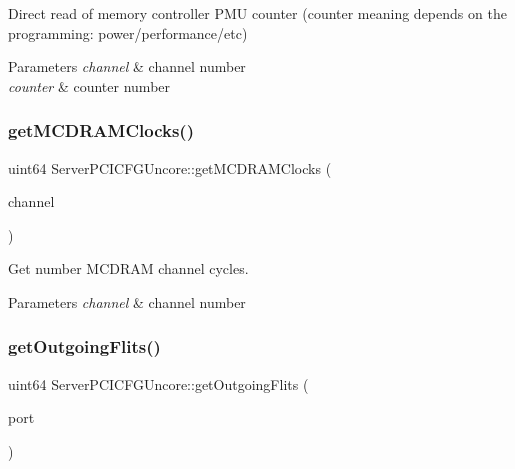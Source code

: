 Direct read of memory controller P\+MU counter (counter meaning depends on the programming\+: power/performance/etc) 


\begin{DoxyParams}{Parameters}
{\em channel} & channel number \\
\hline
{\em counter} & counter number \\
\hline
\end{DoxyParams}
\mbox{\label{class_server_p_c_i_c_f_g_uncore_ad0138169a52467871058a4f810482e0e}} 
\subsubsection{\texorpdfstring{get\+M\+C\+D\+R\+A\+M\+Clocks()}{getMCDRAMClocks()}}
{\footnotesize\ttfamily uint64 Server\+P\+C\+I\+C\+F\+G\+Uncore\+::get\+M\+C\+D\+R\+A\+M\+Clocks (\begin{DoxyParamCaption}\item[{uint32}]{channel }\end{DoxyParamCaption})}



Get number M\+C\+D\+R\+AM channel cycles. 


\begin{DoxyParams}{Parameters}
{\em channel} & channel number \\
\hline
\end{DoxyParams}
\mbox{\label{class_server_p_c_i_c_f_g_uncore_ac318caa49f90d9cf3ee335656aa1f623}} 
\subsubsection{\texorpdfstring{get\+Outgoing\+Flits()}{getOutgoingFlits()}}
{\footnotesize\ttfamily uint64 Server\+P\+C\+I\+C\+F\+G\+Uncore\+::get\+Outgoing\+Flits (\begin{DoxyParamCaption}\item[{uint32}]{port }\end{DoxyParamCaption})}



